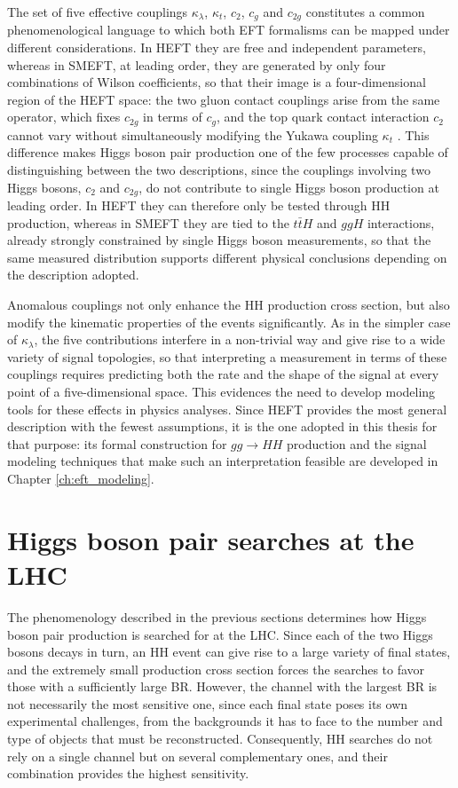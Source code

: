The set of five effective couplings $\kappa_{\lambda}$, $\kappa_t$, $c_2$, $c_g$ and $c_{2g}$ constitutes a common phenomenological language to which both EFT formalisms can be mapped under different considerations. In HEFT they are free and independent parameters, whereas in SMEFT, at leading order, they are generated by only four combinations of Wilson coefficients, so that their image is a four-dimensional region of the HEFT space: the two gluon contact couplings arise from the same operator, which fixes $c_{2g}$ in terms of $c_g$, and the top quark contact interaction $c_2$ cannot vary without simultaneously modifying the Yukawa coupling $\kappa_t$ \cite{Heinrich:2022huh}. This difference makes Higgs boson pair production one of the few processes capable of distinguishing between the two descriptions, since the couplings involving two Higgs bosons, $c_2$ and $c_{2g}$, do not contribute to single Higgs boson production at leading order. In HEFT they can therefore only be tested through HH production, whereas in SMEFT they are tied to the $t\bar{t}H$ and $ggH$ interactions, already strongly constrained by single Higgs boson measurements, so that the same measured distribution supports different physical conclusions depending on the description adopted.\medskip

Anomalous couplings not only enhance the HH production cross section, but also modify the kinematic properties of the events significantly. As in the simpler case of $\kappa_\lambda$, the five contributions interfere in a non-trivial way and give rise to a wide variety of signal topologies, so that interpreting a measurement in terms of these couplings requires predicting both the rate and the shape of the signal at every point of a five-dimensional space. This evidences the need to develop modeling tools for these effects in physics analyses. Since HEFT provides the most general description with the fewest assumptions, it is the one adopted in this thesis for that purpose: its formal construction for $gg\to HH$ production and the signal modeling techniques that make such an interpretation feasible are developed in Chapter \ref{ch:eft_modeling}.

\section{Higgs boson pair searches at the LHC}
\label{sec:HH_searches}
%
The phenomenology described in the previous sections determines how Higgs boson pair production is searched for at the LHC. Since each of the two Higgs bosons decays in turn, an HH event can give rise to a large variety of final states, and the extremely small production cross section forces the searches to favor those with a sufficiently large BR. However, the channel with the largest BR is not necessarily the most sensitive one, since each final state poses its own experimental challenges, from the backgrounds it has to face to the number and type of objects that must be reconstructed. Consequently, HH searches do not rely on a single channel but on several complementary ones, and their combination provides the highest sensitivity.


